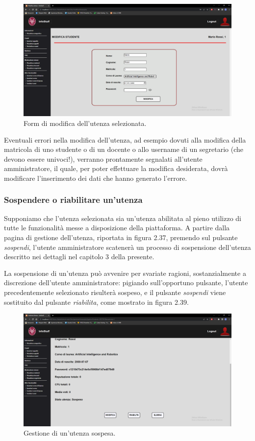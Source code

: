 \documentclass [a4paper,11pt]{book}
\begin{document}
\begin{figure}
\centering
\includegraphics[scale=0.3]{figura2-38.png}
\caption{Form di modifica dell'utenza selezionata.}
\end{figure}

Eventuali errori nella modifica dell'utenza, ad esempio dovuti alla modifica della matricola di uno studente o di un docente o allo username di un segretario (che devono essere univoci!), verranno prontamente segnalati all'utente amministratore, il quale, per poter effettuare la modifica desiderata, dovrà modificare l'inserimento dei dati che hanno generato l'errore.

\medskip

\subsubsection{Sospendere o riabilitare un'utenza}

Supponiamo che l'utenza selezionata sia un'utenza abilitata al pieno utilizzo di tutte le funzionalità messe a disposizione della piattaforma. A partire dalla pagina di gestione dell'utenza, riportata in figura 2.37, premendo sul pulsante \emph{sospendi}, l'utente amministratore scatenerà un processo di sospensione dell'utenza descritto nei dettagli nel capitolo 3 della presente. 

La sospensione di un'utenza può avvenire per svariate ragioni, sostanzialmente a discrezione dell'utente amministratore: pigiando sull'opportuno pulsante, l'utente precedentemente selezionato risulterà sospeso, e il pulsante \emph{sospendi} viene sostituito dal pulsante \emph{riabilita}, come mostrato in figura 2.39.

\begin{figure}
\centering
\includegraphics[scale=0.3]{figura2-39.png}
\caption{Gestione di un'utenza sospesa.}
\end{figure}
\end{document}
